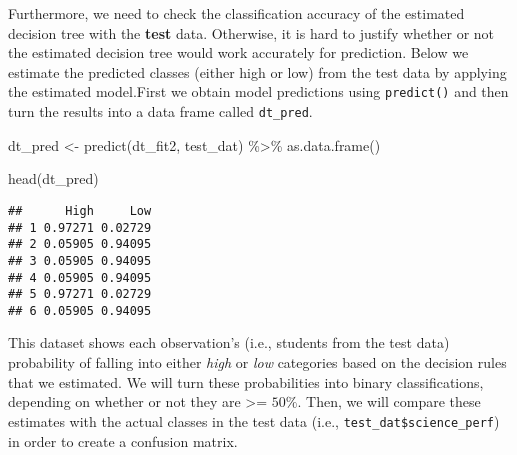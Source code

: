 \documentclass[
]{book}
\newenvironment{Shaded}{\begin{snugshade}}{\end{snugshade}}
\newcommand{\AttributeTok}[1]{\textcolor[rgb]{0.77,0.63,0.00}{#1}}
\newcommand{\FloatTok}[1]{\textcolor[rgb]{0.00,0.00,0.81}{#1}}
\newcommand{\FunctionTok}[1]{\textcolor[rgb]{0.00,0.00,0.00}{#1}}
\newcommand{\NormalTok}[1]{#1}
\newcommand{\OtherTok}[1]{\textcolor[rgb]{0.56,0.35,0.01}{#1}}
\newcommand{\SpecialCharTok}[1]{\textcolor[rgb]{0.00,0.00,0.00}{#1}}
\newcommand{\StringTok}[1]{\textcolor[rgb]{0.31,0.60,0.02}{#1}}
\begin{document}
Furthermore, we need to check the classification accuracy of the estimated decision tree with the \textbf{test} data. Otherwise, it is hard to justify whether or not the estimated decision tree would work accurately for prediction. Below we estimate the predicted classes (either high or low) from the test data by applying the estimated model.First we obtain model predictions using \texttt{predict()} and then turn the results into a data frame called \texttt{dt\_pred}.

\begin{Shaded}
\begin{Highlighting}[]
\NormalTok{dt\_pred }\OtherTok{\textless{}{-}} \FunctionTok{predict}\NormalTok{(dt\_fit2, test\_dat) }\SpecialCharTok{\%\textgreater{}\%}
  \FunctionTok{as.data.frame}\NormalTok{()}

\FunctionTok{head}\NormalTok{(dt\_pred)}
\end{Highlighting}
\end{Shaded}

\begin{verbatim}
##      High     Low
## 1 0.97271 0.02729
## 2 0.05905 0.94095
## 3 0.05905 0.94095
## 4 0.05905 0.94095
## 5 0.97271 0.02729
## 6 0.05905 0.94095
\end{verbatim}

This dataset shows each observation's (i.e., students from the test data) probability of falling into either \emph{high} or \emph{low} categories based on the decision rules that we estimated. We will turn these probabilities into binary classifications, depending on whether or not they are \textgreater= \(50\%\). Then, we will compare these estimates with the actual classes in the test data (i.e., \texttt{test\_dat\$science\_perf}) in order to create a confusion matrix.

\begin{Shaded}
\end{Shaded}
\end{document}
